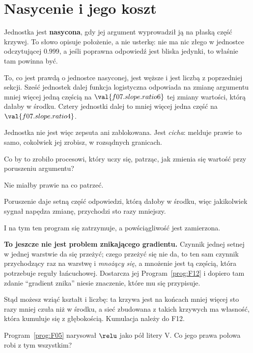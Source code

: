 \section{Nasycenie i jego koszt}
\label{sec:F07-saturation}

\begin{fr}
Jednostka jest \textbf{nasycona}, gdy jej argument wyprowadził ją na płaską
część krzywej. To słowo opisuje położenie, a nie usterkę: nie ma nic złego w
jednostce odczytującej $\num{0.999}$, a jeśli poprawna odpowiedź jest bliska
jedynki, to właśnie tam powinna być.

To, co jest prawdą o jednostce nasyconej, jest węższe i jest liczbą z
poprzedniej sekcji. Sześć jednostek dalej funkcja logistyczna odpowiada na
zmianę argumentu mniej więcej jedną częścią na $\val{f07.slope.ratio6}$ tej
zmiany wartości, którą dałaby w środku. Cztery jednostki dalej to mniej
więcej jedna część na $\val{f07.slope.ratio4}$.

Jednostka nie jest więc zepsuta ani zablokowana. Jest \emph{cicha}: melduje
prawie to samo, cokolwiek jej zrobisz, w rozsądnych granicach.

Co by to zrobiło procesowi, który uczy się, patrząc, jak zmienia się wartość
przy poruszeniu argumentu?
\nextframe
\end{fr}

\begin{fr}
\begin{ansblock}
Nie miałby prawie na co patrzeć.
\end{ansblock}

Poruszenie daje setną część odpowiedzi, którą dałoby w środku, więc
jakikolwiek sygnał napędza zmianę, przychodzi sto razy mniejszy.

\begin{rigourbox}
I na tym ten program się zatrzymuje, a powściągliwość jest zamierzona.

\textbf{To jeszcze nie jest problem znikającego gradientu.} Czynnik jednej
setnej w jednej warstwie da się przeżyć; czego przeżyć się nie da, to ten sam
czynnik przychodzący raz na warstwę i \emph{mnożący się}, a mnożenie jest tą
częścią, która potrzebuje reguły łańcuchowej. Dostarcza jej
Program~\ref{prog:F12} i dopiero tam zdanie \enquote{gradient znika} niesie
znaczenie, które mu się przypisuje.

Stąd możesz wziąć kształt i liczbę: ta krzywa jest na końcach mniej więcej sto
razy mniej czuła niż w środku, a sieć zbudowana z takich krzywych ma własność,
która kumuluje się z głębokością. Kumulacja należy do F12.
\end{rigourbox}

Program~\ref{prog:F05} narysował $\relu$ jako pół litery V. Co jego prawa
połowa robi z tym wszystkim?
\nextframe
\end{fr}

